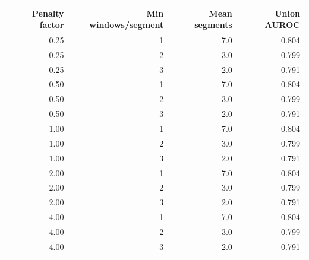 \begin{tabular}{rrrr}
\toprule
Penalty factor & Min windows/segment & Mean segments & Union AUROC \\
\midrule
0.25 & 1 & 7.0 & 0.804 \\
0.25 & 2 & 3.0 & 0.799 \\
0.25 & 3 & 2.0 & 0.791 \\
0.50 & 1 & 7.0 & 0.804 \\
0.50 & 2 & 3.0 & 0.799 \\
0.50 & 3 & 2.0 & 0.791 \\
1.00 & 1 & 7.0 & 0.804 \\
1.00 & 2 & 3.0 & 0.799 \\
1.00 & 3 & 2.0 & 0.791 \\
2.00 & 1 & 7.0 & 0.804 \\
2.00 & 2 & 3.0 & 0.799 \\
2.00 & 3 & 2.0 & 0.791 \\
4.00 & 1 & 7.0 & 0.804 \\
4.00 & 2 & 3.0 & 0.799 \\
4.00 & 3 & 2.0 & 0.791 \\
\bottomrule
\end{tabular}
